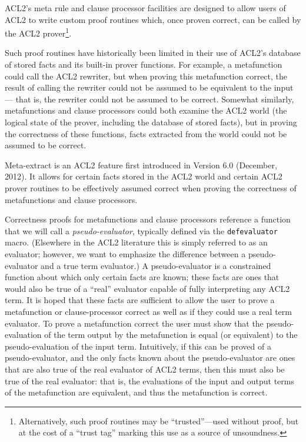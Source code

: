 

ACL2's meta rule and clause processor facilities are designed to allow
users of ACL2 to write custom proof routines which, once proven
correct, can be called by the ACL2 prover\footnote{Alternatively, such
  proof routines may be ``trusted''---used without proof, but at the
  cost of a ``trust tag'' marking this use as a source of
  unsoundness.}.

Such proof routines have historically been limited in their use of
ACL2's database of stored facts and its built-in prover functions.
For example, a metafunction could call the ACL2 rewriter, but when
proving this metafunction correct, the result of calling the rewriter
could not be assumed to be equivalent to the input --- that is, the
rewriter could not be assumed to be correct.  Somewhat similarly,
metafunctions and clause processors could both examine the ACL2 world
(the logical state of the prover, including the database of stored
facts), but in proving the correctness of these functions, facts
extracted from the world could not be assumed to be correct.

Meta-extract is an ACL2 feature first introduced in Version 6.0
(December, 2012).  It allows for certain facts stored in the ACL2
world and certain ACL2 prover routines to be effectively assumed
correct when proving the correctness of metafunctions and clause
processors.

Correctness proofs for metafunctions and clause processors reference a
function that we will call a \textit{pseudo-evaluator}, typically
defined via the \texttt{defevaluator} macro.  (Elsewhere in the ACL2
literature this is simply referred to as an evaluator; however, we
want to emphasize the difference between a pseudo-evaluator and a true
term evaluator.)  A pseudo-evaluator is a constrained function about
which only certain facts are known; these facts are ones that would
also be true of a ``real'' evaluator capable of fully interpreting any
ACL2 term.  It is hoped that these facts are sufficient to allow the
user to prove a metafunction or clause-processor correct as well as if
they could use a real term evaluator.  To prove a metafunction correct
the user must show that the pseudo-evaluation of the term output by
the metafunction is equal (or equivalent) to the pseudo-evaluation of
the input term.  Intuitively, if this can be proved of a
pseudo-evaluator, and the only facts known about the pseudo-evaluator
are ones that are also true of the real evaluator of ACL2 terms, then
this must also be true of the real evaluator: that is, the evaluations
of the input and output terms of the metafunction are equivalent, and
thus the metafunction is correct.

